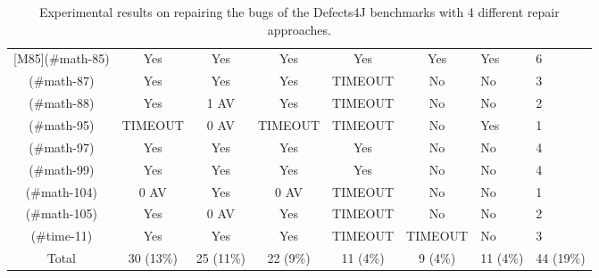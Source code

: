 \begin{table}[!t]
{\begin{tabular}{|c|c|c|c|c|c|}
[M85](#math-85)   & Yes       & Yes       & Yes       & Yes       & Yes       & Yes       &      6 \\
[M87](#math-87)   & Yes       & Yes       & Yes       & TIMEOUT   & No        & No        &      3 \\
[M88](#math-88)   & Yes       & 1 AV      & Yes       & TIMEOUT   & No        & No        &      2 \\
[M95](#math-95)   & TIMEOUT   & 0 AV      & TIMEOUT   & TIMEOUT   & No        & Yes       &      1 \\
[M97](#math-97)   & Yes       & Yes       & Yes       & Yes       & No        & No        &      4 \\
[M99](#math-99)   & Yes       & Yes       & Yes       & Yes       & No        & No        &      4 \\
[M104](#math-104) & 0 AV      & Yes       & 0 AV      & TIMEOUT   & No        & No        &      1 \\
[M105](#math-105) & Yes       & 0 AV      & Yes       & TIMEOUT   & No        & No        &      2 \\
\hline
[T11](#time-11)   & Yes       & Yes       & Yes       & TIMEOUT   & TIMEOUT   & No        &      3 \\
\hline
Total             & 30 (13\%) & 25 (11\%) & 22 (9\%)  & 11 (4\%)  & 9 (4\%)   & 11 (4\%)  & 44 (19\%)\\
\hline 
\end{tabular}%
}
\caption{Experimental results on repairing the bugs of the Defects4J benchmarks with 4 different repair approaches.}
\end{table}
